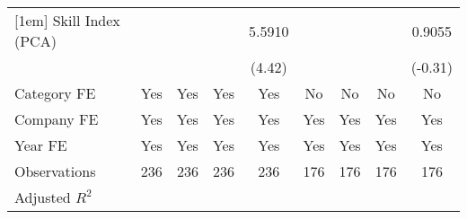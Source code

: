 {\begin{tabular}{l*{8}{c}}
[1em]
Skill Index (PCA)                  &                     &                     &                     &      5.5910\sym{***}&                     &                     &                     &      0.9055         \\
                                   &                     &                     &                     &      (4.42)         &                     &                     &                     &     (-0.31)         \\
[1em]
Category FE                        &         Yes         &         Yes         &         Yes         &         Yes         &          No         &          No         &          No         &          No         \\
[1em]
Company FE                         &         Yes         &         Yes         &         Yes         &         Yes         &         Yes         &         Yes         &         Yes         &         Yes         \\
[1em]
Year FE                            &         Yes         &         Yes         &         Yes         &         Yes         &         Yes         &         Yes         &         Yes         &         Yes         \\
\hline
Observations                       &         236         &         236         &         236         &         236         &         176         &         176         &         176         &         176         \\
Adjusted \(R^{2}\)                 &                     &                     &                     &                     &                     &                     &                     &                     \\
\hline\hline
\end{tabular}
}
